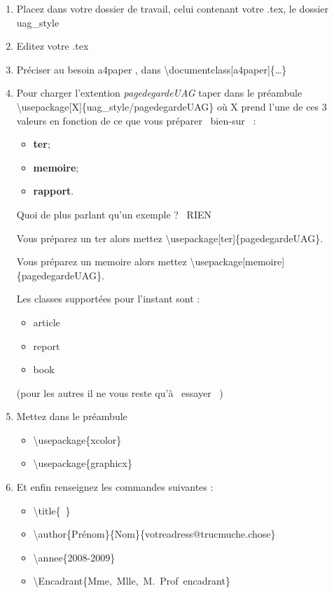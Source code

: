 \documentclass[10pt]{article}
\newcommand{\LOL}[1]{\mbox{\raisebox{1em}{\rotatebox{-90}{:-)}}\raisebox{2em}{\rotatebox{-90}{:-)}}\hspace{-2ex}\rotatebox{-90}{:-)}}~#1~%
\mbox{\raisebox{2em}{\rotatebox{-90}{:-)}}\hspace{-2ex}\rotatebox{-90}{:-)}\raisebox{1em}{\rotatebox{-90}{:-)}}}}
\begin{document}
\begin{enumerate}
 \item  Placez dans votre dossier de travail, celui contenant votre .tex, le dossier uag\_style

 \item  Editez votre .tex

  \item Pr\'eciser au besoin a4paper , dans \textbackslash documentclass[a4paper]\{\ldots\}

 \item  Pour charger l'extention \emph{pagedegardeUAG} taper dans le pr\'eambule
\mbox{\textbackslash usepackage[X]\{uag\_style/pagedegardeUAG\}}
	o\`u X prend l'une de ces 3 valeurs en fonction de ce que vous pr\'eparer \LOL{bien-sur}:
		\begin{itemize}
		    \item \textbf{ter};
		    \item \textbf{memoire};
		    \item \textbf{rapport}.
		\end{itemize}

Quoi de plus parlant qu'un exemple ? \LOL{RIEN}

	    Vous pr\'eparez un \og ter \fg{} alors mettez 
	\mbox{\textbackslash usepackage[ter]\{pagedegardeUAG\}}.

	    Vous pr\'eparez un \og memoire \fg{} alors mettez 
	\mbox{\textbackslash usepackage[memoire]\{pagedegardeUAG\}}.

	Les classes support\'ees pour l'instant sont :
	\begin{itemize}
		\item article
		\item report
		\item book
	\end{itemize}
		(pour les autres il ne vous reste qu'\`a \LOL{essayer} )

 \item  Mettez dans le pr\'eambule 
	\begin{itemize}
		\item \mbox{\textbackslash usepackage\{xcolor\}}
		\item \mbox{\textbackslash usepackage\{graphicx\}}
	\end{itemize}
 \item  Et enfin renseignez les commandes suivantes :
	\begin{itemize}
		\item \mbox{\textbackslash title\{ \}}
		\item \mbox{\textbackslash author\{Pr\'enom\}\{Nom\}\{votreadress@trucmuche.chose\}}
		\item \mbox{\textbackslash annee\{2008-2009\}}
		\item \mbox{\textbackslash Encadrant\{Mme, Mlle, M. Prof encadrant\}}
	\end{itemize}


\end{enumerate}
\end{document}

